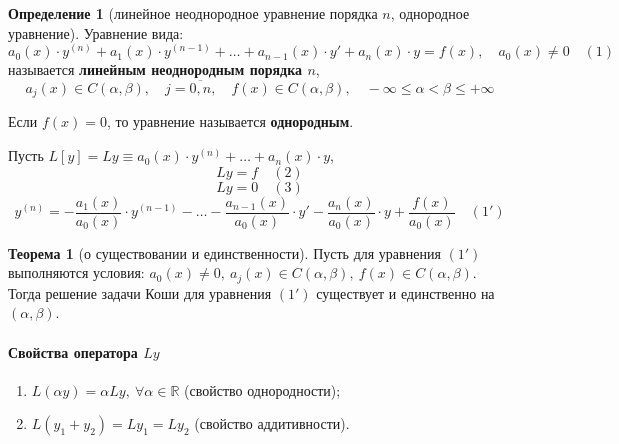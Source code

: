 \documentclass{report}
\theoremstyle{definition}
\newtheorem{definition}{Определение}[section]
\newtheorem{theorem}{Теорема}[section]
\begin{document}
\begin{definition}[линейное неоднородное уравнение порядка $n$, однородное уравнение]
    Уравнение вида:
    \begin{equation*}
        a_0(x) \cdot y^{(n)} + a_1(x) \cdot y^{(n-1)} + \ldots + a_{n-1}(x)\cdot y' + a_n(x) \cdot y = f(x), \quad a_0(x) \ne 0 \quad (1)
    \end{equation*}
    называется \textbf{линейным неоднородным порядка $n$},
    \begin{equation*}
        a_j(x) \in C(\alpha,\beta), \quad j = \overline{0,n}, \quad f(x) \in C(\alpha, \beta), \quad -\infty \leqslant \alpha < \beta \leqslant + \infty
    \end{equation*}

    Если $f(x) = 0$, то уравнение называется \textbf{однородным}.

    Пусть $L[y] = Ly \equiv a_0 (x) \cdot y^{(n)} + \ldots + a_n(x) \cdot y$,
    \begin{equation*}
        Ly = f \quad (2)
    \end{equation*}
    \begin{equation*}
        Ly = 0 \quad (3)
    \end{equation*}
    \begin{equation*}
        y^{(n)} = - \frac{a_1(x)}{a_0(x)} \cdot y^{(n-1)} - \ldots - \frac{a_{n-1}(x)}{a_0(x)} \cdot y' - \frac{a_n(x)}{a_0(x)} \cdot y + \frac{f(x)}{a_0(x)} \quad (1')
    \end{equation*}
\end{definition}

\begin{theorem}[о существовании и единственности]
    Пусть для уравнения $(1')$ выполняются условия: $a_0(x) \ne 0, \ a_j(x) \in C(\alpha,\beta), \ f(x) \in C(\alpha, \beta)$. Тогда решение задачи Коши для уравнения $(1')$ существует и единственно на $(\alpha, \beta)$.
\end{theorem}

\paragraph*{Свойства оператора $Ly$}

\begin{enumerate}
    \item $L(\alpha y) = \alpha Ly, \ \forall \alpha \in \mathbb{R}$ (свойство однородности);
    \item $L(y_1 + y_2) = Ly_1 = Ly_2$ (свойство аддитивности).
\end{enumerate}
\end{document}
